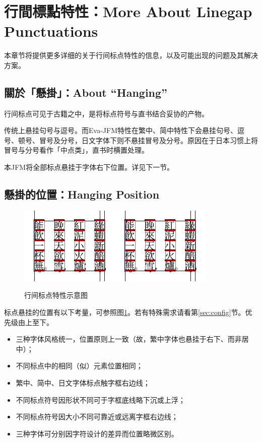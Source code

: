 \documentclass{ltjsarticle}
\def\空{\quad}
\def\段{\par}
\begin{document}
\section{行間標點特性：More About Linegap Punctuations}\label{sec:lgp}
本章节将提供更多详细的关于行间标点特性的信息，以及可能出现的问题及其解决方案。

\subsection{關於「懸掛」：About ``Hanging''}
行间标点可见于古籍之中，是将标点符号与直书结合妥协的产物。\段
传统上悬挂句号与逗号。而\textsf{Eva-JFM}特性在繁中、简中特性下会悬挂句号、逗号、顿号、冒号及分号，日文字体下则不悬挂冒号及分号。原因在于日本习惯上将冒号与分号看作「中点类」，直书时横置处理。\段
本JFM将全部标点悬挂于字体右下位置。详见下一节。

\subsection{懸掛的位置：Hanging Position}
\begin{figure}[htb]
    \centering
    \includegraphics[height = 12\zh]{figure/fig-tc.pdf}\空\includegraphics[height = 12\zh]{figure/fig-jp.pdf}
    \caption{行间标点特性示意图}\label{fig:lgp}
\end{figure}

标点悬挂的位置有以下考量，可参照图\ref{fig:lgp}。若有特殊需求请看第\ref{sec:config}节。优先级由上至下。
\begin{itemize}
    \item 三种字体风格统一，位置原则上一致（故，繁中字体也悬挂于右下、而非居中）；
    \item 不同标点中的相同（似）元素位置相同；
    \item 繁中、简中、日文字体标点触字框右边线；
    \item 不同标点符号因形状不同可于字框底线略下沉或上浮；
    \item 不同标点符号因大小不同可靠近或远离字框右边线；
    \item 三种字体可分别因字符设计的差异而位置略微区别。
\end{itemize}
\end{document}
